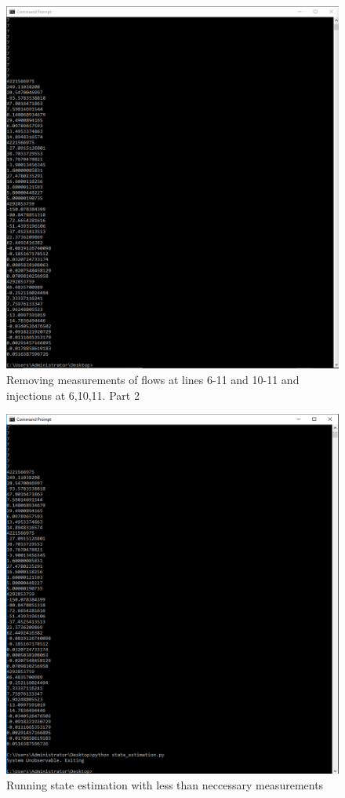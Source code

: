 \begin{figure}
\includegraphics[width=\textwidth]{Figures/unobs_2.png}
\caption{Removing measurements of flows at lines 6-11 and 10-11 and injections at 6,10,11. Part 2}
\label{fig:unobs1}
\end{figure}
\begin{figure}
\includegraphics[width=\textwidth]{Figures/non_obs.png}
\caption{Running state estimation with less than neccessary measurements}
\label{fig:unobs1}
\end{figure}
